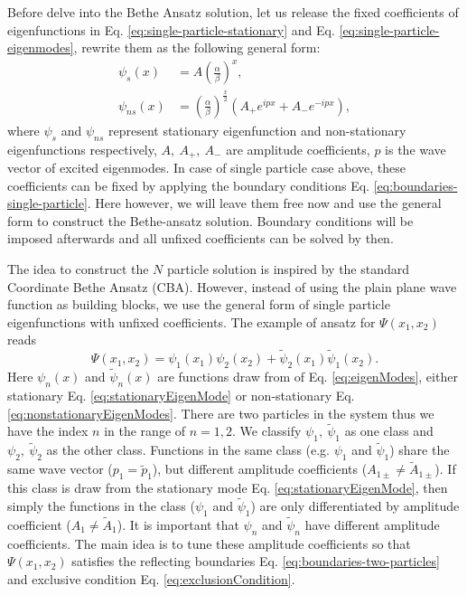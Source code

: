 Before delve into the Bethe Ansatz solution, let us release the fixed coefficients of eigenfunctions in Eq. \eqref{eq:single-particle-stationary} and Eq. \eqref{eq:single-particle-eigenmodes}, rewrite them as the following general form:
\begin{subequations}
    \label{eq:eigenModes}
\begin{align}
    \label{eq:stationaryEigenMode}
    \psi_s(x)  & =  A\left(\frac{\alpha}{\beta}\right)^x, \\
    \label{eq:nonstationaryEigenModes}
    \psi_{ns}(x) & =  \left(\frac{\alpha}{\beta}\right)^{\frac{x}{2}} \left(A_+ e^{ipx} +  A_-e^{-ipx}\right),
\end{align}
\end{subequations}
where $\psi_s$ and $\psi_{ns}$ represent stationary eigenfunction and non-stationary eigenfunctions respectively, $A,~A_+,~A_-$ are amplitude coefficients, $p$ is the wave vector of excited eigenmodes. In case of single particle case above, these coefficients can be fixed by applying the boundary conditions Eq. \eqref{eq:boundaries-single-particle}. Here however, we will leave them free now and use the general form to construct the Bethe-ansatz solution. Boundary conditions will be imposed afterwards and all unfixed coefficients can be solved by then. 

The idea to construct the $N$ particle solution is inspired by the standard Coordinate Bethe Ansatz (CBA). However, instead of using the plain plane wave function as building blocks, we use the general form of single particle eigenfunctions with unfixed coefficients. The example of ansatz for $\Psi(x_1, x_2)$ reads
\begin{equation}
    \label{eq:ansatzTwo}
    \Psi(x_1, x_2) = \psi_1(x_1)\psi_2(x_2) + \tilde{\psi}_2(x_1)\tilde{\psi}_1(x_2).
\end{equation}
Here $\psi_n(x)$ and $\tilde{\psi}_n(x)$ are functions draw from of Eq. \eqref{eq:eigenModes}, either stationary Eq. \eqref{eq:stationaryEigenMode} or non-stationary Eq.\eqref{eq:nonstationaryEigenModes}. There are two particles in the system thus we have the index $n$ in the range of $n=1,2$. 
We classify $\psi_1, ~\tilde{\psi}_1$ as one class and $\psi_2,~\tilde{\psi}_2$ as the other class. Functions in the same class (e.g. $\psi_1$ and $\tilde{\psi}_1$) share the same wave vector ($p_1=\tilde{p}_1$), but different amplitude coefficients ($A_{1\pm}\neq \tilde{A}_{1\pm}$). If this class is draw from the stationary mode Eq. \eqref{eq:stationaryEigenMode}, then simply the functions in the class ($\psi_1$ and $\tilde{\psi}_1$) are only differentiated by amplitude coefficient ($A_1\neq\tilde{A}_1$). 
It is important that $\psi_n$ and $\tilde{\psi}_n$ have different amplitude coefficients. The main idea is to tune these amplitude coefficients so that $\Psi(x_1, x_2)$ satisfies the reflecting boundaries Eq. \eqref{eq:boundaries-two-particles} and exclusive condition Eq. \eqref{eq:exclusionCondition}.  

